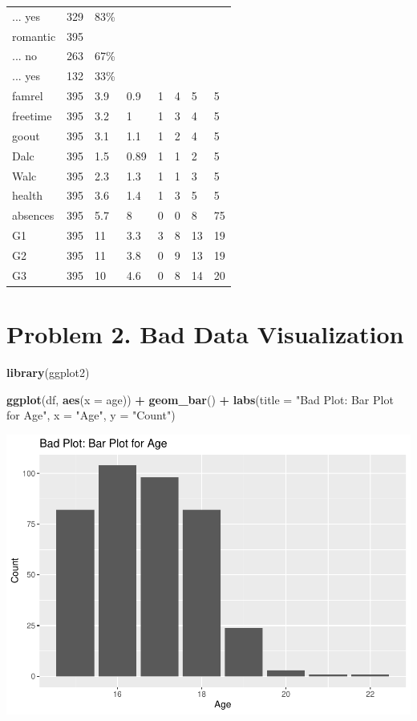 \documentclass[
  11pt,
]{article}
\newenvironment{Shaded}{\begin{snugshade}}{\end{snugshade}}
\newcommand{\AttributeTok}[1]{\textcolor[rgb]{0.13,0.29,0.53}{#1}}
\newcommand{\FunctionTok}[1]{\textcolor[rgb]{0.13,0.29,0.53}{\textbf{#1}}}
\newcommand{\NormalTok}[1]{#1}
\newcommand{\SpecialCharTok}[1]{\textcolor[rgb]{0.81,0.36,0.00}{\textbf{#1}}}
\newcommand{\StringTok}[1]{\textcolor[rgb]{0.31,0.60,0.02}{#1}}
\begin{document}
\begin{table}
\begin{tabular}[t]{llllllll}
... yes & 329 & 83\% &  &  &  &  & \\
romantic & 395 &  &  &  &  &  & \\
... no & 263 & 67\% &  &  &  &  & \\
\addlinespace
... yes & 132 & 33\% &  &  &  &  & \\
famrel & 395 & 3.9 & 0.9 & 1 & 4 & 5 & 5\\
freetime & 395 & 3.2 & 1 & 1 & 3 & 4 & 5\\
goout & 395 & 3.1 & 1.1 & 1 & 2 & 4 & 5\\
Dalc & 395 & 1.5 & 0.89 & 1 & 1 & 2 & 5\\
\addlinespace
Walc & 395 & 2.3 & 1.3 & 1 & 1 & 3 & 5\\
health & 395 & 3.6 & 1.4 & 1 & 3 & 5 & 5\\
absences & 395 & 5.7 & 8 & 0 & 0 & 8 & 75\\
G1 & 395 & 11 & 3.3 & 3 & 8 & 13 & 19\\
G2 & 395 & 11 & 3.8 & 0 & 9 & 13 & 19\\
\addlinespace
G3 & 395 & 10 & 4.6 & 0 & 8 & 14 & 20\\
\bottomrule
\end{tabular}
\end{table}

\section{Problem 2. Bad Data
Visualization}\label{problem-2.-bad-data-visualization}

\begin{Shaded}
\begin{Highlighting}[]
\FunctionTok{library}\NormalTok{(ggplot2)}

\FunctionTok{ggplot}\NormalTok{(df, }\FunctionTok{aes}\NormalTok{(}\AttributeTok{x =}\NormalTok{ age)) }\SpecialCharTok{+}
  \FunctionTok{geom\_bar}\NormalTok{() }\SpecialCharTok{+}
  \FunctionTok{labs}\NormalTok{(}\AttributeTok{title =} \StringTok{"Bad Plot: Bar Plot for Age"}\NormalTok{, }\AttributeTok{x =} \StringTok{"Age"}\NormalTok{, }\AttributeTok{y =} \StringTok{"Count"}\NormalTok{)}
\end{Highlighting}
\end{Shaded}

\includegraphics{figs/unnamed-chunk-4.pdf}
\end{document}
